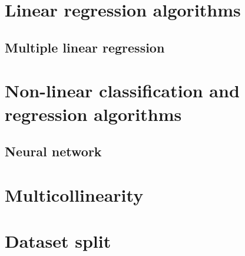 \section{Linear regression algorithms}
	\subsection{Multiple linear regression} \label{sec:mul-lin-reg}

\section{Non-linear classification and regression algorithms}
	\subsection{Neural network}


\section{Multicollinearity}
\section{Dataset split} \label{sec:datasetsplit}


